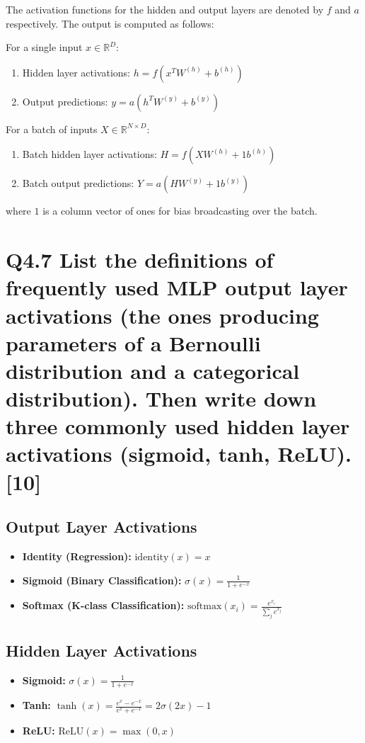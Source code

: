 \documentclass[11pt]{article}
\begin{document}
The activation functions for the hidden and output layers are denoted by \( f \) and \( a \) respectively. The output is computed as follows:

For a single input \( x \in \mathbb{R}^{D} \):
\begin{enumerate}
    \item Hidden layer activations: \( h = f(x^T W^{(h)} + b^{(h)}) \)
    \item Output predictions: \( y = a(h^T W^{(y)} + b^{(y)}) \)
\end{enumerate}

For a batch of inputs \( X \in \mathbb{R}^{N \times D} \):
\begin{enumerate}
    \item Batch hidden layer activations: \( H = f(X W^{(h)} + 1b^{(h)}) \)
    \item Batch output predictions: \( Y = a(H W^{(y)} + 1b^{(y)}) \)
\end{enumerate}
where \( 1 \) is a column vector of ones for bias broadcasting over the batch.

\section{Q4.7 List the definitions of frequently used MLP output layer activations (the ones producing parameters of a Bernoulli distribution and a categorical distribution). Then write down three commonly used hidden layer activations (sigmoid, tanh, ReLU). [10]}

\subsection*{Output Layer Activations}
\begin{itemize}
    \item \textbf{Identity (Regression):} \( \text{identity}(x) = x \)
    \item \textbf{Sigmoid (Binary Classification):} \( \sigma(x) = \frac{1}{1 + e^{-x}} \)
    \item \textbf{Softmax (K-class Classification):} \( \text{softmax}(x_i) = \frac{e^{x_i}}{\sum_{j} e^{x_j}} \)
\end{itemize}

\subsection*{Hidden Layer Activations}
\begin{itemize}
    \item \textbf{Sigmoid:} \( \sigma(x) = \frac{1}{1 + e^{-x}} \)
    \item \textbf{Tanh:} \( \tanh(x) = \frac{e^{x} - e^{-x}}{e^{x} + e^{-x}} = 2\sigma(2x)-1\)
    \item \textbf{ReLU:} \( \text{ReLU}(x) = \max(0, x) \)
\end{itemize}
\end{document}
